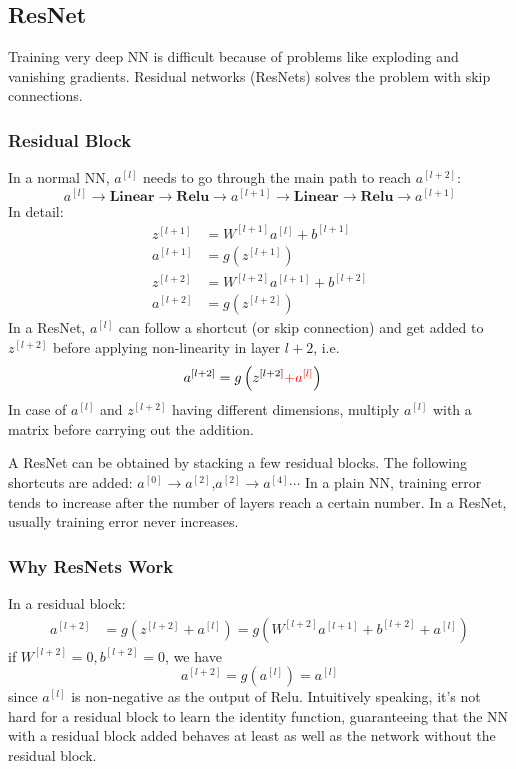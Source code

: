 \subsection{ResNet}
Training very deep NN is difficult because of problems like exploding and vanishing gradients. Residual networks (ResNets) solves the problem with skip connections.
\subsubsection{Residual Block}
In a normal NN, $a^{[l]}$ needs to go through the main path to reach $a^{[l+2]}$:
\[a^{[l]}\rightarrow\textbf{Linear}\rightarrow\textbf{Relu}\rightarrow a^{[l+1]}\rightarrow\textbf{Linear}\rightarrow\textbf{Relu}\rightarrow a^{[l+1]}\]
In detail: 
\begin{align*}
  z^{[l+1]}&=W^{[l+1]}a^{[l]}+b^{[l+1]}\\
  a^{[l+1]}&=g\left(z^{[l+1]}\right)\\
  z^{[l+2]}&=W^{[l+2]}a^{[l+1]}+b^{[l+2]}\\
  a^{[l+2]}&=g\left(z^{[l+2]}\right)
\end{align*}
In a ResNet, $a^{[l]}$ can follow a shortcut (or skip connection) and get added to $z^{[l+2]}$ before applying non-linearity in layer $l+2$, i.e.
\begin{align*}
  a^{[l+2]}&=g\left(z^{[l+2]}{\color{red}+a^{[l]}}\right)
\end{align*}
In case of $a^{[l]}$ and $z^{[l+2]}$ having different dimensions, multiply $a^{[l]}$ with a matrix before carrying out the addition.

A ResNet can be obtained by stacking a few residual blocks. The following shortcuts are added: $a^{[0]}\rightarrow a^{[2]}$,$a^{[2]}\rightarrow a^{[4]}\cdots$
In a plain NN, training error tends to increase after the number of layers reach a certain number. In a ResNet, usually training error never increases.
\subsubsection{Why ResNets Work}
In a residual block: 
\begin{align*}
  a^{[l+2]}&=g\left(z^{[l+2]}+a^{[l]}\right)=g\left(W^{[l+2]}a^{[l+1]}+b^{[l+2]}+a^{[l]}\right)
\end{align*}
if $W^{[l+2]}=0,b^{[l+2]}=0$, we have
\[a^{[l+2]}=g\left(a^{[l]}\right)=a^{[l]}\]
since $a^{[l]}$ is non-negative as the output of Relu. Intuitively speaking, it's not hard for a residual block to learn the identity function, guaranteeing that the NN with a residual block added behaves at least as well as the network without the residual block.
